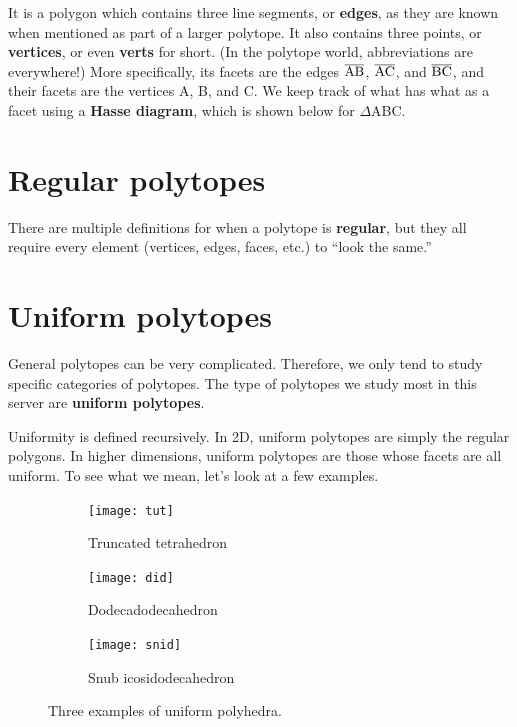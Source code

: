 \documentclass{article}
\begin{document}
It is a polygon which contains three line segments,
or \textbf{edges}, as they are known
when mentioned as part of a larger polytope.
It also contains three points, or \textbf{vertices},
or even \textbf{verts} for short.
(In the polytope world, abbreviations are everywhere!)
More specifically, its facets are the edges
$\overline{\rm AB}$, $\overline{\rm AC}$, and $\overline{\rm BC}$,
and their facets are the vertices A, B, and C.
We keep track of what has what as a facet using a \textbf{Hasse diagram},
which is shown below for $\Delta$ABC.

\begin{center}
\end{center}

\section{Regular polytopes}
There are multiple definitions for when a polytope is \textbf{regular},
but they all require every element (vertices, edges, faces, etc.) to ``look the same.''

\section{Uniform polytopes}
General polytopes can be very complicated. Therefore, we only tend to study specific categories of polytopes. The type of polytopes we study most in this server are \textbf{uniform polytopes}.

Uniformity is defined recursively. In 2D, uniform polytopes are simply the regular polygons.
In higher dimensions, uniform polytopes are those whose facets are all uniform. To see what we mean, let's look at a few examples.

\begin{figure}[H]
  \centering
  \begin{subfigure}{.33333\textwidth}
    \centering
    \texttt{[image: tut]}
    \caption{Truncated tetrahedron}
    \label{fig:tut}
  \end{subfigure}%
  \begin{subfigure}{.33333\textwidth}
    \centering
    \texttt{[image: did]}
    \caption{Dodecadodecahedron}
    \label{fig:did}
  \end{subfigure}%
  \begin{subfigure}{.33333\textwidth}
    \centering
    \texttt{[image: snid]}
    \caption{Snub icosidodecahedron}
    \label{fig:snid}
  \end{subfigure}%
  \caption{Three examples of uniform polyhedra.}
  \label{fig:uniforms3D}
\end{figure}
\end{document}
